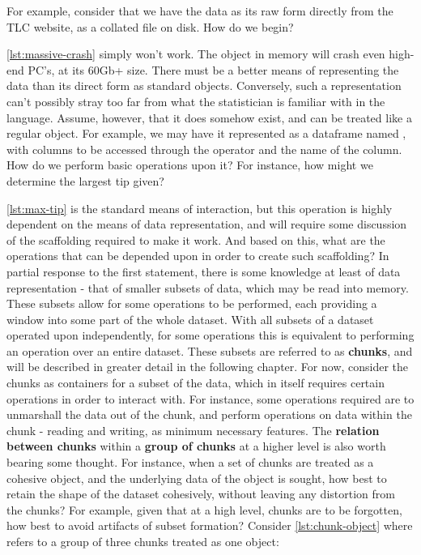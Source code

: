 For example, consider that we have the data as its raw form directly from the TLC website, as a collated  file on disk.
How do we begin?


\cref{lst:massive-crash} simply won't work.
The object in memory will crash even high-end PC's, at its 60Gb+ size.
There must be a better means of representing the data than its direct form as standard \R{} objects.
Conversely, such a representation can't possibly stray too far from what the statistician is familiar with in the language.
Assume, however, that it does somehow exist, and can be treated like a regular object.
For example, we may have it represented as a dataframe named , with columns to be accessed through the  operator and the name of the column.
How do we perform basic operations upon it?
For instance, how might we determine the largest tip given?


\cref{lst:max-tip} is the standard means of interaction, but this operation is highly
dependent on the means of data representation, and will require some
discussion of the scaffolding required to make it work.
And based on this, what are the operations that can be depended upon in order to create such scaffolding?
In partial response to the first statement, there is some knowledge at least of data representation - that of smaller subsets of data, which may be read into memory.
These subsets allow for some operations to be performed, each providing a window into some part of the whole dataset.
With all subsets of a dataset operated upon independently, for some operations this is equivalent to performing an operation over an entire dataset.
These subsets are referred to as \textbf{chunks}, and will be described in greater detail in the following chapter.
For now, consider the chunks as containers for a subset of the data, which in itself requires certain operations in order to interact with.
For instance, some operations required are to unmarshall the data out of the chunk, and perform operations on data within the chunk - reading and writing, as minimum necessary features.
The \textbf{relation between chunks} within a \textbf{group of chunks} at a higher level is also worth bearing some thought.
For instance, when a set of chunks are treated as a cohesive object, and the underlying data of the object is sought, how best to retain the shape of the dataset cohesively, without leaving any distortion from the chunks?
For example, given that at a high level, chunks are to be forgotten, how best to avoid artifacts of subset formation?
Consider \cref{lst:chunk-object} where  refers to a group of three chunks treated as one object:

